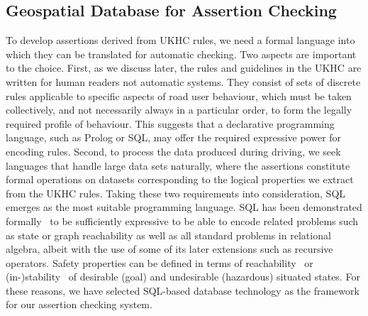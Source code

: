








\subsection{Geospatial Database for Assertion Checking} \label{geospatial_database}
To develop assertions derived from UKHC rules, we need a formal language into which they can be translated for automatic checking. Two aspects are important to the choice. First, as we discuss later, the rules and guidelines in the UKHC are written for human readers not automatic systems. They consist of sets of discrete rules applicable to specific aspects of road user behaviour, which must be taken collectively, and not necessarily always in a particular order, to form the legally required profile of behaviour. This suggests that a declarative programming language, such as Prolog or SQL, may offer the required expressive power for encoding rules.
%
Second, to process the data produced during driving, we seek languages that handle large data sets naturally, where the assertions constitute formal operations on datasets corresponding to the logical properties we extract from the UKHC rules. 
%
Taking these two requirements into consideration, SQL emerges as the most suitable programming language. SQL has been demonstrated formally~\cite{sqllibkin} to be sufficiently expressive to be able to encode related problems such as state or graph reachability as well as all standard problems in relational algebra, albeit with the use of some of its later extensions such as recursive operators. Safety properties can be defined in terms of reachability~\cite{guiochet2015, masson2019} or (in-)stability~\cite{harper2005, xue2020} of desirable (goal) and undesirable (hazardous) situated states. For these reasons, we have selected SQL-based database technology as the framework for our assertion %
checking system.

